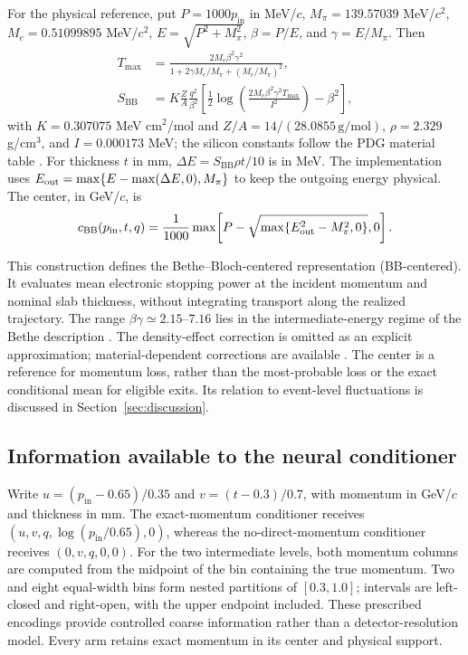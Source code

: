 \documentclass[11pt]{article}
\newcommand{\pin}{p_{\mathrm{in}}}
\begin{document}
For the physical reference, put $P=1000\pin$ in MeV/$c$,
$M_\pi=139.57039$ MeV/$c^2$, $M_e=0.51099895$ MeV/$c^2$,
$E=\sqrt{P^2+M_\pi^2}$, $\beta=P/E$, and $\gamma=E/M_\pi$. Then
\begin{align}
 T_{\max}&=\frac{2M_e\beta^2\gamma^2}
 {1+2\gamma M_e/M_\pi+(M_e/M_\pi)^2},\\
 S_{\mathrm{BB}}&=K\frac{Z}{A}\frac{q^2}{\beta^2}
 \left[\frac12\log\!\left(\frac{2M_e\beta^2\gamma^2T_{\max}}{I^2}\right)-\beta^2\right],
\end{align}
with $K=0.307075$ MeV cm$^2$/mol and $Z/A=14/(28.0855\,\mathrm{g/mol})$,
$\rho=2.329$ g/cm$^3$, and $I=0.000173$ MeV; the silicon constants follow the PDG material table \citep{PDGSilicon2025}. For thickness $t$ in mm,
$\Delta E=S_{\mathrm{BB}}\rho t/10$ is in MeV. The implementation uses
$E_{\rm out}=\max\{E-\max(\Delta E,0),M_\pi\}$ to keep the outgoing
energy physical. The center, in GeV/$c$, is
\begin{equation}
 c_{\mathrm{BB}}(\pin,t,q)=\frac{1}{1000}
 \max\!\left[P-\sqrt{\max\{E_{\rm out}^2-M_\pi^2,0\}},0\right].
\end{equation}

This construction defines the Bethe--Bloch-centered representation
(BB-centered). It evaluates mean electronic stopping power at the incident
momentum and nominal slab thickness, without integrating transport along the
realized trajectory. The range $\beta\gamma\simeq2.15$--$7.16$ lies in the
intermediate-energy regime of the Bethe description \citep{PDG2025}.
The density-effect correction is omitted as an explicit approximation;
material-dependent corrections are available \citep{SternheimerBergerSeltzer1983}.
The center is a reference for momentum loss, rather than the most-probable
loss or the exact conditional mean for eligible exits. Its relation to
event-level fluctuations is discussed in Section~\ref{sec:discussion}.

\subsection{Information available to the neural conditioner}
\label{sec:information_design}

Write $u=(\pin-0.65)/0.35$ and $v=(t-0.3)/0.7$, with momentum in
GeV/$c$ and thickness in mm. The exact-momentum conditioner receives
$(u,v,q,\log(\pin/0.65),0)$, whereas the no-direct-momentum conditioner
receives $(0,v,q,0,0)$. For the two intermediate levels, both momentum
columns are computed from the midpoint of the bin containing the true momentum.
Two and eight equal-width bins form nested partitions of $[0.3,1.0]$;
intervals are left-closed and right-open, with the upper endpoint included.
These prescribed encodings provide controlled coarse information rather than
a detector-resolution model. Every arm retains exact momentum in its center
and physical support.
\end{document}
